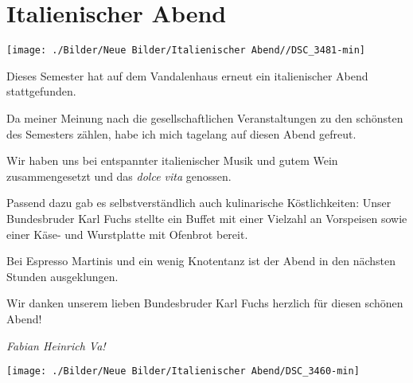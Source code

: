 \section{Italienischer Abend}

\begin{figurehere}
		\begin{center}
			\texttt{[image: ./Bilder/Neue Bilder/Italienischer Abend//DSC\_3481-min]}
		\end{center}
	\end{figurehere}

\begin{multicols}{2}

Dieses Semester hat auf dem Vandalenhaus erneut ein italienischer Abend
stattgefunden.

Da meiner Meinung nach
die gesellschaftlichen Veranstaltungen zu den schönsten des Semesters zählen,
habe ich mich tagelang auf diesen Abend gefreut.

Wir haben uns bei entspannter italienischer Musik und gutem Wein
zusammengesetzt und das \textit{dolce vita} genossen.

Passend dazu gab es
selbstverständlich auch kulinarische Köstlichkeiten: Unser Bundesbruder Karl
Fuchs stellte ein Buffet mit einer Vielzahl an Vorspeisen sowie einer Käse- und
Wurstplatte mit Ofenbrot bereit.

Bei Espresso Martinis und ein wenig Knotentanz ist der Abend in den
nächsten Stunden ausgeklungen.

Wir danken unserem lieben Bundesbruder Karl Fuchs herzlich für diesen
schönen Abend!

	\begin{flushright}
		\hfill\emph{Fabian Heinrich Va!}
	\end{flushright}
\end{multicols}

\begin{center}
\begin{figurehere}\texttt{[image: ./Bilder/Neue Bilder/Italienischer Abend/DSC\_3460-min]}
\end{figurehere}
\end{center}
	
